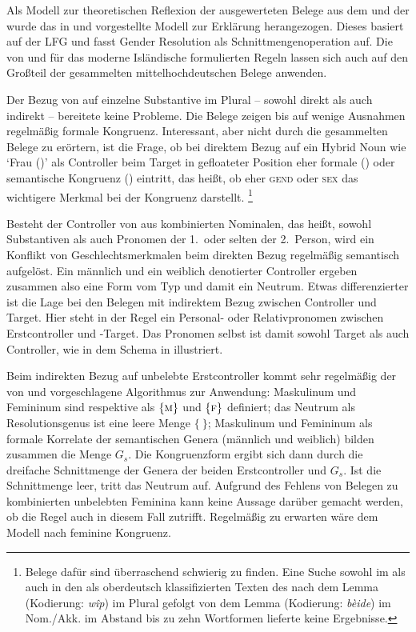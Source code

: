 Als Modell zur theoretischen Reflexion der ausgewerteten Belege aus dem
\CAO{} und der \KC{} wurde das in \citet{wechsler2009} und
\citet{wechslerzlatic2003} vorgestellte Modell zur Erklärung herangezogen.
Dieses basiert auf der LFG und fasst Gender Resolution als
Schnittmengenoperation auf. Die von \citet[578]{wechsler2009} und
\citet[186]{wechslerzlatic2003} für das moderne Isländische formulierten Regeln
lassen sich auch auf den Großteil der gesammelten mittelhochdeutschen Belege
anwenden.

Der Bezug von  auf einzelne Substantive im Plural -- sowohl direkt
als auch indirekt -- bereitete keine Probleme. Die Belege zeigen bis auf wenige
Ausnahmen regelmäßig formale Kongruenz. Interessant, aber nicht durch die
gesammelten Belege zu erörtern, ist die Frage, ob bei direktem Bezug auf ein
Hybrid Noun wie  `Frau (\NeutF)' als Controller beim Target in
gefloateter Position eher formale () oder semantische Kongruenz
() eintritt, das heißt, ob eher \textsc{gend} oder \textsc{sex} das
wichtigere Merkmal bei der Kongruenz darstellt.%
%
	\footnote{Belege dafür sind überraschend schwierig zu finden. Eine Suche
		sowohl im \CAO{} als auch in den als oberdeutsch klassifizierten Texten
		des \REM{} nach dem Lemma  (Kodierung: \emph{wîp}) im
		Plural gefolgt von dem Lemma  (Kodierung: \emph{bèide})
		im Nom./Akk. im Abstand bis zu zehn Wortformen lieferte keine
		Ergebnisse.}

Besteht der Controller von  aus kombinierten Nominalen, das heißt,
sowohl Substantiven als auch Pronomen der 1.\ oder selten der 2.\ Person, wird
ein Konflikt von Geschlechtsmerkmalen beim direkten Bezug regelmäßig semantisch
aufgelöst. Ein männlich und ein weiblich denotierter Controller ergeben
zusammen also eine Form vom Typ  und damit ein Neutrum. Etwas
differenzierter ist die Lage bei den Belegen mit indirektem Bezug zwischen
Controller und Target. Hier steht in der Regel ein Personal- oder
Relativpronomen zwischen Erstcontroller und -Target. Das Pronomen
selbst ist damit sowohl Target als auch Controller, wie in dem Schema in
 illustriert.

Beim indirekten Bezug auf unbelebte Erstcontroller kommt sehr regelmäßig der
von \citet[577]{wechsler2009} und \citet[184]{wechslerzlatic2003}
vorgeschlagene Algorithmus zur Anwendung: Maskulinum und Femininum sind
respektive als $\{\textsc{m}\}$ und $\{\textsc{f}\}$ definiert; das Neutrum als
Resolutionsgenus ist eine leere Menge $\{\ \}$; Maskulinum und Femininum als
formale Korrelate der semantischen Genera (männlich und weiblich) bilden
zusammen die Menge $G_s$. Die Kongruenzform ergibt sich dann durch die
dreifache Schnittmenge der Genera der beiden Erstcontroller und $G_s$. Ist die
Schnittmenge leer, tritt das Neutrum auf. Aufgrund des Fehlens von Belegen zu
kombinierten unbelebten Feminina kann keine Aussage darüber gemacht werden, ob
die Regel auch in diesem Fall zutrifft. Regelmäßig zu erwarten wäre dem Modell
nach feminine Kongruenz.

